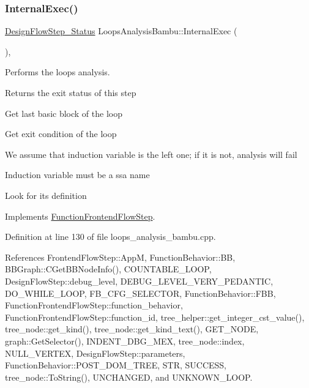 \mbox{\label{classLoopsAnalysisBambu_a74777cea2f8fe8405e32a348d585a3d1}} 
\subsubsection{\texorpdfstring{Internal\+Exec()}{InternalExec()}}
{\footnotesize\ttfamily \hyperlink{design__flow__step_8hpp_afb1f0d73069c26076b8d31dbc8ebecdf}{Design\+Flow\+Step\+\_\+\+Status} Loops\+Analysis\+Bambu\+::\+Internal\+Exec (\begin{DoxyParamCaption}{ }\end{DoxyParamCaption})\hspace{0.3cm}{\ttfamily [override]}, {\ttfamily [virtual]}}



Performs the loops analysis. 

\begin{DoxyReturn}{Returns}
the exit status of this step 
\end{DoxyReturn}
Get last basic block of the loop

Get exit condition of the loop

We assume that induction variable is the left one; if it is not, analysis will fail

Induction variable must be a ssa name

Look for its definition 

Implements \hyperlink{classFunctionFrontendFlowStep_a00612f7fb9eabbbc8ee7e39d34e5ac68}{Function\+Frontend\+Flow\+Step}.



Definition at line 130 of file loops\+\_\+analysis\+\_\+bambu.\+cpp.



References Frontend\+Flow\+Step\+::\+AppM, Function\+Behavior\+::\+BB, B\+B\+Graph\+::\+C\+Get\+B\+B\+Node\+Info(), C\+O\+U\+N\+T\+A\+B\+L\+E\+\_\+\+L\+O\+OP, Design\+Flow\+Step\+::debug\+\_\+level, D\+E\+B\+U\+G\+\_\+\+L\+E\+V\+E\+L\+\_\+\+V\+E\+R\+Y\+\_\+\+P\+E\+D\+A\+N\+T\+IC, D\+O\+\_\+\+W\+H\+I\+L\+E\+\_\+\+L\+O\+OP, F\+B\+\_\+\+C\+F\+G\+\_\+\+S\+E\+L\+E\+C\+T\+OR, Function\+Behavior\+::\+F\+BB, Function\+Frontend\+Flow\+Step\+::function\+\_\+behavior, Function\+Frontend\+Flow\+Step\+::function\+\_\+id, tree\+\_\+helper\+::get\+\_\+integer\+\_\+cst\+\_\+value(), tree\+\_\+node\+::get\+\_\+kind(), tree\+\_\+node\+::get\+\_\+kind\+\_\+text(), G\+E\+T\+\_\+\+N\+O\+DE, graph\+::\+Get\+Selector(), I\+N\+D\+E\+N\+T\+\_\+\+D\+B\+G\+\_\+\+M\+EX, tree\+\_\+node\+::index, N\+U\+L\+L\+\_\+\+V\+E\+R\+T\+EX, Design\+Flow\+Step\+::parameters, Function\+Behavior\+::\+P\+O\+S\+T\+\_\+\+D\+O\+M\+\_\+\+T\+R\+EE, S\+TR, S\+U\+C\+C\+E\+SS, tree\+\_\+node\+::\+To\+String(), U\+N\+C\+H\+A\+N\+G\+ED, and U\+N\+K\+N\+O\+W\+N\+\_\+\+L\+O\+OP.

